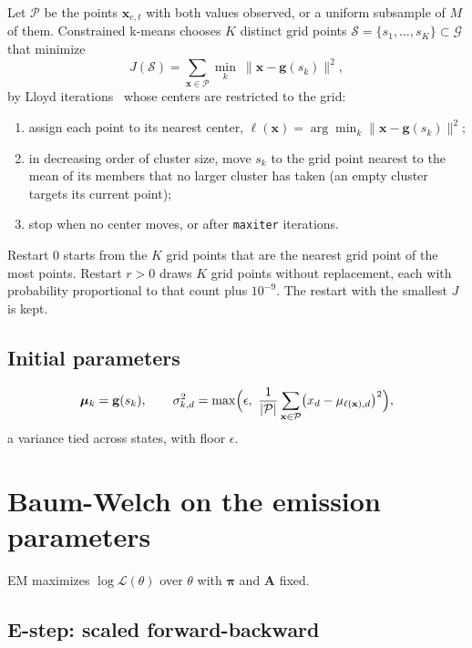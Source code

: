 \documentclass[11pt]{article}
\newcommand{\code}[1]{\texttt{#1}}
\newcommand{\x}{\mathbf{x}}
\begin{document}
Let $\mathcal{P}$ be the points $\x_{e,t}$ with both values observed, or a uniform subsample of
$M$ of them. Constrained k-means chooses $K$ distinct grid points
$\mathcal{S} = \{s_1, \dots, s_K\} \subset \mathcal{G}$ that minimize
\begin{equation}
J(\mathcal{S}) = \sum_{\x \in \mathcal{P}} \min_{k}\ \lVert \x - \mathbf{g}(s_k) \rVert^2 ,
\label{eq:kmeans}
\end{equation}
by Lloyd iterations~\cite{lloyd1982,isl2021,mackay2003} whose centers are restricted to the grid:
\begin{enumerate}[nosep]
\item assign each point to its nearest center,
  $\ell(\x) = \arg\min_k \lVert \x - \mathbf{g}(s_k) \rVert^2$;
\item in decreasing order of cluster size, move $s_k$ to the grid point nearest to the mean of
  its members that no larger cluster has taken (an empty cluster targets its current point);
\item stop when no center moves, or after \code{maxiter} iterations.
\end{enumerate}
Restart 0 starts from the $K$ grid points that are the nearest grid point of the most points.
Restart $r > 0$ draws $K$ grid points without replacement, each with probability proportional to
that count plus $10^{-9}$. The restart with the smallest $J$ is kept.

\subsection{Initial parameters}\label{sec:init-params}

\begin{equation}
\bm\mu_k = \mathbf{g}(s_k), \qquad
\sigma^2_{k,d} = \max\Bigl(\epsilon,\ \frac{1}{|\mathcal{P}|}\sum_{\x \in \mathcal{P}}
  \bigl(x_d - \mu_{\ell(\x),d}\bigr)^2\Bigr),
\label{eq:init}
\end{equation}
a variance tied across states, with floor $\epsilon$.

\section{Baum-Welch on the emission parameters}\label{sec:em}

EM maximizes $\log\mathcal{L}(\theta)$ over $\theta$ with $\bm\pi$ and $\mathbf{A}$ fixed.

\subsection{E-step: scaled forward-backward}\label{sec:estep}
\end{document}
